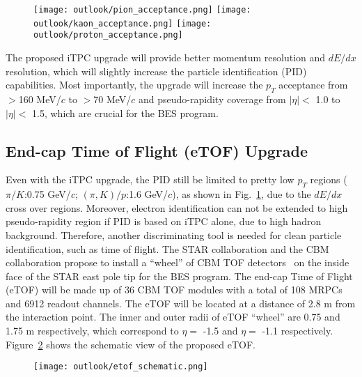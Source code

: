 \begin{figure}[htbp]
\centering
\texttt{[image: outlook/pion\_acceptance.png]}
\texttt{[image: outlook/kaon\_acceptance.png]}
\texttt{[image: outlook/proton\_acceptance.png]}
 \label{pidLimits}
\end{figure}
 
 The proposed iTPC upgrade will provide better momentum resolution and $dE/dx$ resolution, which will slightly increase the particle identification (PID) capabilities. Most importantly, the upgrade will increase the $p_{T}$ acceptance from $>$160 MeV/$c$ to $>$70 MeV/$c$ and pseudo-rapidity coverage from $|\eta|<$ 1.0 to $|\eta|<$ 1.5, which are crucial for the BES \uppercase\expandafter{} program.
  
\subsection{End-cap Time of Flight (eTOF) Upgrade}
Even with the iTPC upgrade, the PID still be limited to pretty low $p_{T}$ regions ($\pi/K$:0.75 GeV/$c$; $(\pi,K)/p$:1.6 GeV/$c$), as shown in Fig.~\ref{pidLimits}, due to the $dE/dx$ cross over regions. Moreover, electron identification can not be extended to high pseudo-rapidity region if PID is based on iTPC alone, due to high hadron background. Therefore, another discriminating tool is needed for clean particle identification, such as time of flight. The STAR collaboration and the CBM collaboration propose to install a ``wheel'' of CBM TOF detectors~\cite{CBMTof} on the inside face of the STAR east pole tip for the BES \uppercase\expandafter{} program. The end-cap Time of Flight (eTOF) will be made up of 36 CBM TOF modules with a total of 108 MRPCs and 6912 readout channels. The eTOF will be located at a distance of 2.8 m from the interaction point. The inner and outer radii of eTOF ``wheel'' are 0.75 and 1.75 m respectively, which correspond to $\eta=$ -1.5 and $\eta=$ -1.1 respectively. Figure~\ref{eTOF} shows the schematic view of the proposed eTOF. 

\begin{figure}[htbp]
\centering
\texttt{[image: outlook/etof\_schematic.png]}
 \label{eTOF}
\end{figure}

